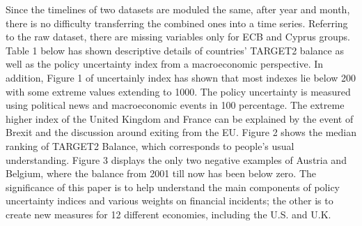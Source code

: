 \documentclass[12pt]{article}
\begin{document}
Since the timelines of two datasets are moduled the same, after year and month, there is no difficulty transferring the combined ones into a time series. Referring to the raw dataset, there are missing variables only for ECB and Cyprus groups. Table 1 below has shown descriptive details of countries' TARGET2 balance as well as the policy uncertainty index from a macroeconomic perspective. In addition, Figure 1 of uncertainly index has shown that most indexes lie below 200 with some extreme values extending to 1000. The policy uncertainty is measured using political news and macroeconomic events in 100 percentage. The extreme higher index of the United Kingdom and France can be explained by the event of Brexit and the discussion around exiting from the EU. Figure 2 shows the median ranking of TARGET2 Balance, which corresponds to people's usual understanding. Figure 3 displays the only two negative examples of Austria and Belgium, where the balance from 2001 till now has been below zero. The significance of this paper is to help understand the main components of policy uncertainty indices and various weights on financial incidents; the other is to create new measures for 12 different economies, including the U.S. and U.K. 
\end{document}
